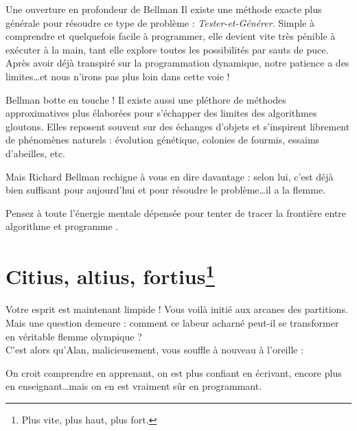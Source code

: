\documentclass[a4paper,twoside]{article}
\begin{document}
  \begin{plusloin}{Une ouverture en profondeur de Bellman}
    Il existe une méthode exacte plus générale pour résoudre ce type de problème : \emph{Tester-et-Générer}.
    Simple à comprendre et quelquefois facile à programmer, elle devient vite très pénible à exécuter à la main, tant elle explore toutes les possibilités par sauts de puce.
    Après avoir déjà transpiré sur la programmation dynamique, notre patience a des limites\dots et nous n'irons pas plus loin dans cette voie !
  \end{plusloin}



    \begin{plusloin}{Bellman botte en touche !}
      Il existe aussi une pléthore de méthodes approximatives plus élaborées pour s'échapper des limites des algorithmes gloutons.
      Elles reposent souvent sur des échanges d'objets et s'inspirent librement de phénomènes naturels : évolution génétique, colonies de fourmis, essaims d'abeilles, etc.

      Mais Richard Bellman rechigne à vous en dire davantage : selon lui, c'est déjà bien suffisant pour aujourd'hui et pour résoudre le problème\dots il a la flemme.
    \end{plusloin}

    \begin{epigramme}
      Pensez à toute l'énergie mentale dépensée pour tenter de tracer la frontière entre \og algorithme \fg et \og programme \fg.
    \end{epigramme}



    \section[Citius, altius, fortius]{Citius, altius, fortius\protect\footnote{Plus vite, plus haut, plus fort.}}

    Votre esprit est maintenant limpide ! Vous voilà initié aux arcanes des partitions.
    Mais une question demeure : comment ce labeur acharné peut-il se transformer en véritable flemme olympique ?
    \\
    C'est alors qu'Alan, malicieusement, vous souffle à nouveau à l'oreille :

    \begin{epigramme}
      On croit comprendre en apprenant, on est plus confiant en écrivant, encore plus en enseignant\dots mais on en est vraiment sûr en programmant.
    \end{epigramme}
\end{document}
